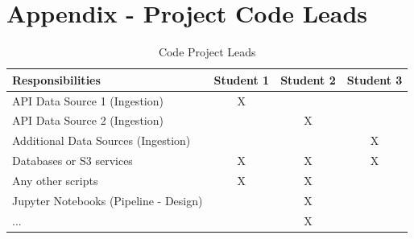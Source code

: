 \chapter[Appendix - Project Code Leads ]{\label{chap:apx_c}Appendix  - Project Code Leads}%
%
  
\begin{table}[h]
\centering
\caption{Code Project Leads}
\renewcommand{\arraystretch}{1.2}

\begin{tabular}{|p{8cm}|c|c|c|}
\hline
\textbf{Responsibilities} & \textbf{Student 1} & \textbf{Student 2} & \textbf{Student 3} \\
\hline
API Data Source 1 (Ingestion) & X & & \\
API Data Source 2 (Ingestion) & & X & \\
Additional Data Sources (Ingestion) & & & X \\
Databases or S3 services & X & X & X \\
Any other scripts & X & X & \\
Jupyter Notebooks (Pipeline - Design) & & X & \\
... & & X & \\
\hline
\end{tabular}
\end{table}